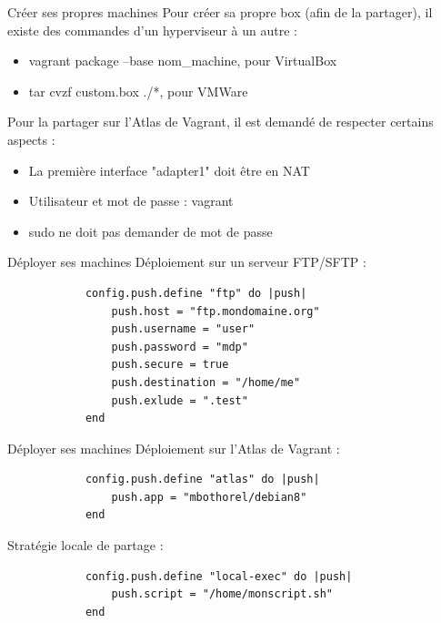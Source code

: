 \documentclass{beamer}
\begin{document}
    \begin{frame}{Créer ses propres machines}
        Pour créer sa propre box (afin de la partager), il existe des commandes d'un hyperviseur à un autre :
        \begin{itemize}
            \item{vagrant package --base nom\_machine, pour VirtualBox}
            \item{tar cvzf custom.box ./*, pour VMWare}
        \end{itemize}
        Pour la partager sur l'Atlas de Vagrant, il est demandé de respecter certains aspects :
        \begin{itemize}
            \item{La première interface "adapter1" doit être en NAT}
            \item{Utilisateur et mot de passe : vagrant}
            \item{sudo ne doit pas demander de mot de passe}
        \end{itemize}
    \end{frame}

    \begin{frame}[containsverbatim]{Déployer ses machines}
        Déploiement sur un serveur FTP/SFTP :
        \begin{verbatim}
            config.push.define "ftp" do |push|
                push.host = "ftp.mondomaine.org"
                push.username = "user"
                push.password = "mdp"
                push.secure = true
                push.destination = "/home/me"
                push.exlude = ".test"
            end
        \end{verbatim}
    \end{frame}
    
    \begin{frame}[containsverbatim]{Déployer ses machines}
        Déploiement sur l'Atlas de Vagrant :
        \begin{verbatim}
            config.push.define "atlas" do |push|
                push.app = "mbothorel/debian8"
            end
        \end{verbatim}
        Stratégie locale de partage :
        \begin{verbatim}
            config.push.define "local-exec" do |push|
                push.script = "/home/monscript.sh"
            end
        \end{verbatim}
    \end{frame}
\end{document}
